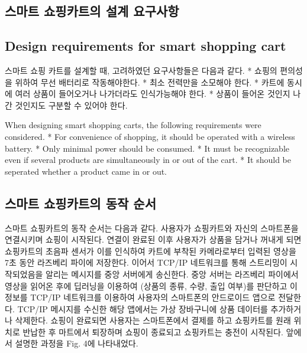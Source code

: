 \documentclass[smallextended]{svjour3}       %
\begin{document}
\hypertarget{uxc2a4uxb9c8uxd2b8-uxc1fcuxd551uxce74uxd2b8uxc758-uxc124uxacc4-uxc694uxad6cuxc0acuxd56d}{%
\subsection{스마트 쇼핑카트의 설계
요구사항}\label{uxc2a4uxb9c8uxd2b8-uxc1fcuxd551uxce74uxd2b8uxc758-uxc124uxacc4-uxc694uxad6cuxc0acuxd56d}}

\hypertarget{design-requirements-for-smart-shopping-cart}{%
\subsection{Design requirements for smart shopping
cart}\label{design-requirements-for-smart-shopping-cart}}

스마트 쇼핑 카트를 설계할 때, 고려하였던 요구사항들은 다음과 같다. *
쇼핑의 편의성을 위하여 무선 배터리로 작동해야한다. * 최소 전력만을
소모해야 한다. * 카트에 동시에 여러 상품이 들어오거나 나가더라도
인식가능해야 한다. * 상품이 들어온 것인지 나간 것인지도 구분할 수 있어야
한다.

When designing smart shopping carts, the following requirements were
considered. * For convenience of shopping, it should be operated with a
wireless battery. * Only minimal power should be consumed. * It must be
recognizable even if several products are simultaneously in or out of
the cart. * It should be seperated whether a product came in or out.

\hypertarget{uxc2a4uxb9c8uxd2b8-uxc1fcuxd551uxce74uxd2b8uxc758-uxb3d9uxc791-uxc21cuxc11c}{%
\subsection{스마트 쇼핑카트의 동작
순서}\label{uxc2a4uxb9c8uxd2b8-uxc1fcuxd551uxce74uxd2b8uxc758-uxb3d9uxc791-uxc21cuxc11c}}

스마트 쇼핑카트의 동작 순서는 다음과 같다. 사용자가 쇼핑카트와 자신의
스마트폰을 연결시키며 쇼핑이 시작된다. 연결이 완료된 이후 사용자가
상품을 담거나 꺼내게 되면 쇼핑카트의 초음파 센서가 이를 인식하여 카트에
부착된 카메라로부터 입력된 영상을 7초 동안 라즈베리 파이에 저장한다.
이어서 TCP/IP 네트워크를 통해 스트리밍이 시작되었음을 알리는 메시지를
중앙 서버에게 송신한다. 중앙 서버는 라즈베리 파이에서 영상을 읽어온 후에
딥러닝을 이용하여 (상품의 종류, 수량, 출입 여부)를 판단하고 이 정보를
TCP/IP 네트워크를 이용하여 사용자의 스마트폰의 안드로이드 앱으로
전달한다. TCP/IP 메시지를 수신한 해당 앱에서는 가상 장바구니에 상품
데이터를 추가하거나 삭제한다. 쇼핑이 완료되면 사용자는 스마트폰에서
결제를 하고 쇼핑카트를 원래 위치로 반납한 후 마트에서 퇴장하며 쇼핑이
종료되고 쇼핑카트는 충전이 시작된다. 앞에서 설명한 과정을 Fig. 4에
나타내었다.
\end{document}
